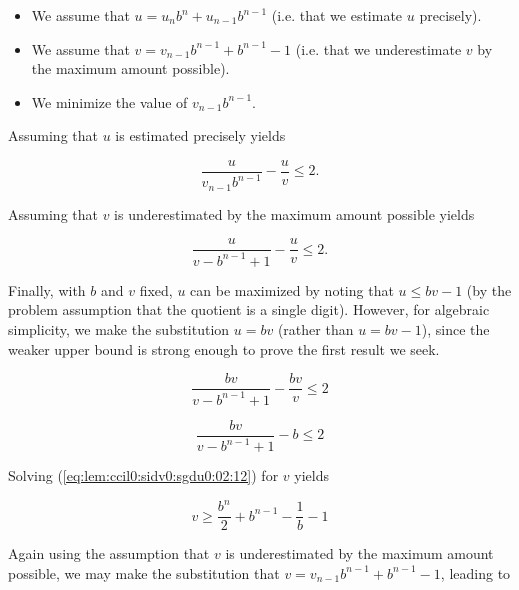 \begin{vworklemmaproof}
\begin{itemize}
\item We assume that $u = u_{n} b^n + u_{n-1} b^{n-1}$ (i.e. that we estimate
      $u$ precisely).
\item We assume that $v = v_{n-1} b^{n-1} + b^{n-1} - 1$ (i.e. that
      we underestimate $v$ by the maximum amount possible).
\item We minimize the value of $v_{n-1} b^{n-1}$.
\end{itemize}

Assuming that $u$ is estimated precisely yields

\begin{equation}
\label{eq:lem:ccil0:sidv0:sgdu0:02:09}
\frac{u}{v_{n-1} b^{n-1}}
                - \frac{u}{v} \leq 2 .
\end{equation}

Assuming that $v$ is underestimated by the maximum amount possible
yields

\begin{equation}
\label{eq:lem:ccil0:sidv0:sgdu0:02:10}
\frac{u}{v - b^{n-1} + 1}
                - \frac{u}{v} \leq 2 .
\end{equation}

Finally, with $b$ and $v$ fixed, $u$ can be maximized by noting that 
$u \leq bv - 1$ (by the problem assumption that the quotient is a single digit).
However, for algebraic simplicity, we make the substitution $u=bv$ (rather than 
$u=bv-1$), since the weaker upper bound is strong enough to prove the 
first result we seek.

\begin{equation}
\label{eq:lem:ccil0:sidv0:sgdu0:02:11}
\frac{bv}{v - b^{n-1} + 1}
                - \frac{bv}{v} \leq 2
\end{equation}

\begin{equation}
\label{eq:lem:ccil0:sidv0:sgdu0:02:12}
\frac{bv}{v - b^{n-1} + 1}
                - b \leq 2
\end{equation}

Solving (\ref{eq:lem:ccil0:sidv0:sgdu0:02:12})
for $v$ yields

\begin{equation}
\label{eq:lem:ccil0:sidv0:sgdu0:02:13}
v \geq \frac{b^n}{2} + b^{n-1} - \frac{1}{b} - 1
\end{equation}

Again using the assumption that $v$ is underestimated by the maximum amount
possible, we may make the substitution that $v = v_{n-1} b^{n-1} + b^{n-1} -1$,
leading to


\end{vworklemmaproof}
